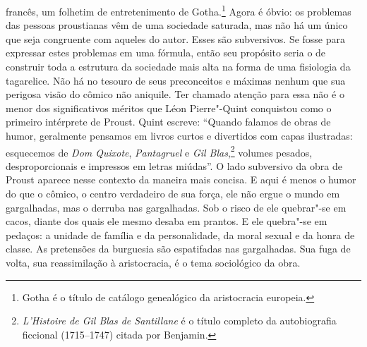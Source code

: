 francês, um folhetim de entretenimento de Gotha.\footnote{Gotha é o
  título de catálogo genealógico da aristocracia europeia. \versal{[N.~O.]}} Agora é
óbvio: os problemas das pessoas proustianas vêm de uma sociedade
saturada, mas não há um único que seja congruente com aqueles do autor.
Esses são subversivos. Se fosse para expressar estes problemas em uma
fórmula, então seu propósito seria o de construir toda a estrutura da
sociedade mais alta na forma de uma fisiologia da tagarelice. Não há no
tesouro de seus preconceitos e máximas nenhum que sua perigosa visão do
cômico não aniquile. Ter chamado atenção para essa não é o menor dos
significativos méritos que Léon Pierre"-Quint conquistou como o primeiro
intérprete de Proust. Quint escreve: ``Quando falamos de obras de humor,
geralmente pensamos em livros curtos e divertidos com capas ilustradas:
esquecemos de \emph{Dom Quixote}, \emph{Pantagruel} e \emph{Gil Blas},\footnote{\emph{L'Histoire de Gil Blas de Santillane} é o título completo da
  autobiografia ficcional (1715--1747) citada por Benjamin. \versal{[N.~T.]}} volumes
pesados, desproporcionais e impressos em letras miúdas''. O lado
subversivo da obra de Proust aparece nesse contexto da maneira mais
concisa. E aqui é menos o humor do que o cômico, o centro verdadeiro de
sua força, ele não ergue o mundo em gargalhadas, mas o derruba nas
gargalhadas. Sob o risco de ele quebrar"-se em cacos, diante dos quais
ele mesmo desaba em prantos. E ele quebra"-se em pedaços: a unidade de
família e da personalidade, da moral sexual e da honra de classe. As
pretensões da burguesia são espatifadas nas gargalhadas. Sua fuga de
volta, sua reassimilação à aristocracia, é o tema sociológico da obra.

